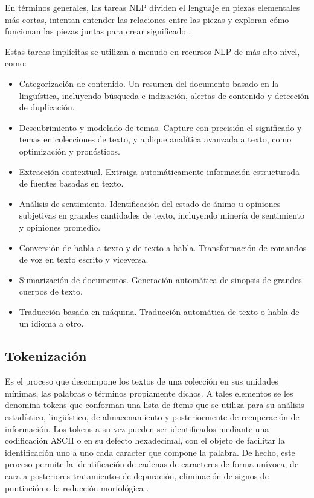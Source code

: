 En términos generales, las tareas NLP dividen el lenguaje en piezas elementales más cortas, intentan entender las relaciones entre 
las piezas y exploran cómo funcionan las piezas juntas para crear significado \citep{CT11}.

Estas tareas implícitas se utilizan a menudo en recursos NLP de más alto nivel, como:
\begin{itemize}
	\item Categorización de contenido. Un resumen del documento basado en la lingüística, 
	incluyendo búsqueda e indización, alertas de contenido y detección de duplicación.
	\item Descubrimiento y modelado de temas. Capture con precisión el significado y temas en colecciones de texto, y 
	aplique analítica avanzada a texto, como optimización y pronósticos.
	\item Extracción contextual. Extraiga automáticamente información estructurada de fuentes basadas en texto.
	\item Análisis de sentimiento. Identificación del estado de ánimo u opiniones subjetivas en grandes cantidades de 
	texto, incluyendo minería de sentimiento y opiniones promedio. 
	\item Conversión de habla a texto y de texto a habla. Transformación de comandos de voz en texto escrito y viceversa. 
	\item Sumarización de documentos. Generación automática de sinopsis de grandes cuerpos de texto.
	\item Traducción basada en máquina. Traducción automática de texto o habla de un idioma a otro.
\end{itemize}


\subsection{Tokenización}
Es el proceso que descompone los textos de una colección en sus unidades mínimas, las palabras
o términos propiamente dichos. A tales elementos se les denomina tokens que conforman una lista de
ítems que se utiliza para su análisis estadístico, ling{\"u}ístico, de almacenamiento y posteriormente de
recuperación de información. Los tokens a su vez pueden ser identificados mediante una codificación
ASCII o en su defecto hexadecimal, con el objeto de facilitar la identificación uno a uno cada caracter
que compone la palabra. De hecho, este proceso permite la identificación de cadenas de caracteres de
forma unívoca, de cara a posteriores tratamientos de depuración, eliminación de signos de puntiación
o la reducción morfológica \citep{CT12}.

